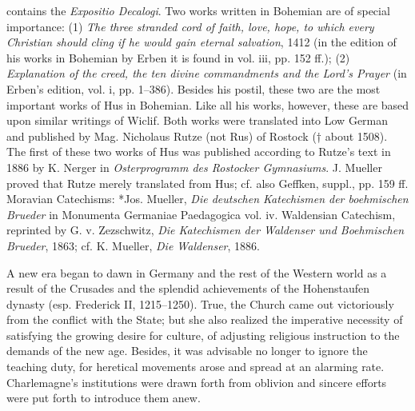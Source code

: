 contains the \emph{Expositio Decalogi}. Two works written in Bohemian are of special importance: (1) \emph{The three stranded cord of faith, love, hope, to which every Christian should cling if he would gain eternal salvation}, 1412 (in the edition of his works in Bohemian by Erben it is found in vol. iii, pp. 152 ff.); (2) \emph{Explanation of the creed, the ten divine commandments and the Lord’s Prayer} (in Erben’s edition, vol. i, pp. 1–386). Besides his postil, these two are the most important works of Hus in Bohemian. Like all his works, however, these are based upon similar writings of Wiclif. Both works were translated into Low German and published by Mag. Nicholaus Rutze (not Rus) of Rostock († about 1508). The first of these two works of Hus was published according to Rutze’s text in 1886 by K. Nerger in \emph{Osterprogramm des Rostocker Gymnasiums}. J. Mueller proved that Rutze merely translated from Hus; cf. also Geffken, suppl., pp. 159 ff. Moravian Catechisms: *Jos. Mueller, \emph{Die deutschen Katechismen der boehmischen Brueder} in Monumenta Germaniae Paedagogica vol. iv. Waldensian Catechism, reprinted by G. v. Zezschwitz, \emph{Die Katechismen der Waldenser und Boehmischen Brueder}, 1863; cf. K. Mueller, \emph{Die Waldenser}, 1886.

A new era began to dawn in Germany and the rest of the Western world as a result of the Crusades and the splendid achievements of the Hohenstaufen dynasty (esp. Frederick II, 1215–1250). True, the Church came out victoriously from the conflict with the State; but she also realized the imperative necessity of satisfying the growing desire for culture, of adjusting religious instruction to the demands of the new age. Besides, it was advisable no longer to ignore the teaching duty, for heretical movements arose and spread at an alarming rate. Charlemagne’s institutions were drawn forth from oblivion and sincere efforts were put forth to introduce them anew.

